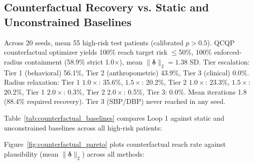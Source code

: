 \documentclass[11pt,a4paper]{article}
\theoremstyle{plain}
\begin{document}
\subsection{Counterfactual Recovery vs. Static and Unconstrained Baselines}
\label{sec:results_counterfactual}

Across 20 seeds, mean 55 high-risk test patients (calibrated $p>0.5$). QCQP counterfactual optimizer yields 100\% reach target risk $\le$50\%, 100\% enforced-radius containment (58.9\% strict 1.0$\times$), mean $\|\boldsymbol\delta\|_2=1.38$ SD. Tier escalation: Tier 1 (behavioral) 56.1\%, Tier 2 (anthropometric) 43.9\%, Tier 3 (clinical) 0.0\%. Radius relaxation: Tier 1 $1.0\times$: 35.6\%, $1.5\times$: 20.2\%, Tier 2 $1.0\times$: 23.3\%, $1.5\times$: 20.2\%, Tier 1 $2.0\times$: 0.3\%, Tier 2 $2.0\times$: 0.5\%, Tier 3: 0.0\%. Mean iterations 1.8 (88.4\% required recovery). Tier 3 (SBP/DBP) never reached in any seed.

Table~\ref{tab:counterfactual_baselines} compares Loop 1 against static and unconstrained baselines across all high-risk patients:

\begin{table}[htbp]
\centering
\caption{Counterfactual recovery comparison on high-risk patients (mean across 20 seeds).}
\label{tab:counterfactual_baselines}
\end{table}

Figure~\ref{fig:counterfactual_pareto} plots counterfactual reach rate against plausibility (mean $\|\boldsymbol{\delta}\|_2$) across all methods:
\end{document}
